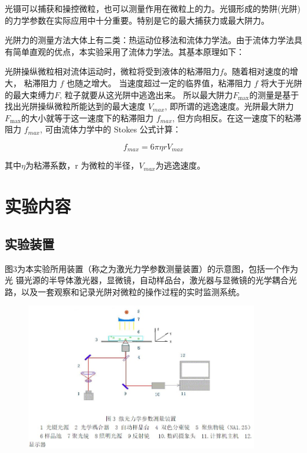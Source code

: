 \documentclass[a4paper,UTF8]{ctexart}
\begin{document}
光镊可以捕获和操控微粒，也可以测量作用在微粒上的力。光镊形成的势阱(光阱) 的力学参数在实际应用中十分重要。特别是它的最大捕获力或最大阱力。

光阱力的测量方法大体上有二类：热运动位移法和流体力学法。由于流体力学法具有简单直观的优点，本实验采用了流体力学法。其基本原理如下：

光阱操纵微粒相对流体运动时，微粒将受到液体的粘滞阻力$f$。随着相对速度的增大， 粘滞阻力 $f$ 也随之增大。
当速度超过一定的临界值，粘滞阻力 $f$ 将大于光阱的最大束缚力$F$, 粒子就要从这光阱中逃逸出来。
所以最大阱力${F}_\mathrm{max}$的测量是基于找出光阱操纵微粒所能达到的最大速度 $V_{max}$,
即所谓的逃逸速度。光阱最大阱力 ${F}_\mathrm{max}$的大小就等于这一速度下的粘滞阻力
 $f_{max}$, 但方向相反。在这一速度下的粘滞阻力 $f_{max}$, 可由流体力学中的 Stokes 公式计算：

\begin{equation}
    f_{max}=6\pi \eta r V_{max}
\end{equation}

其中$\eta$为粘滞系数，r 为微粒的半径，$V_{max}$为逃逸速度。

\section{实验内容}

\subsection{实验装置}

图3为本实验所用装置（称之为激光力学参数测量装置）的示意图，包括一个作为光
镊光源的半导体激光器，显微镜，自动样品台，激光器与显微镜的光学耦合光路，以及一套观察和记录光阱对微粒的操作过程的实时监测系统。

\begin{figure}[H]
    \centering
    \begin{minipage}[b]{0.9\textwidth}
        \centering
        \includegraphics[width=0.9\textwidth]{./fig3.jpg}
    \end{minipage}
\end{figure}
\end{document}
